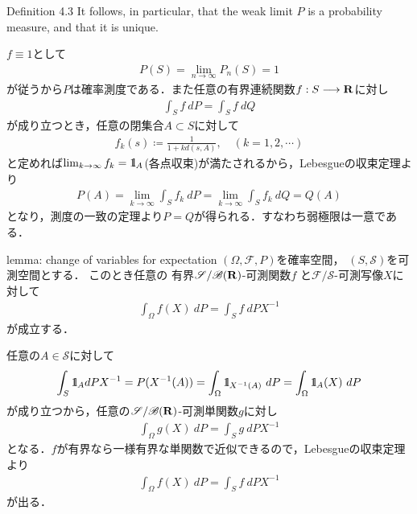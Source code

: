 	\begin{itembox}[l]{Definition 4.3}
		It follows, in particular, that the weak limit $P$ is a probability measure, 
		and that it is unique.
	\end{itembox}
	
	\begin{prf}
		$f \equiv 1$として
		\begin{align}
			P(S) = \lim_{n \to \infty} P_n(S) = 1
		\end{align}
		が従うから$P$は確率測度である．また任意の有界連続関数$f:S \longrightarrow \mathbf{R}$に対し
		\begin{align}
			\int_S f\ dP = \int_S f\ dQ
		\end{align}
		が成り立つとき，任意の閉集合$A \subset S$に対して
		\begin{align}
			f_k(s) \coloneqq \frac{1}{1 + k d(s,A)},
			\quad (k=1,2,\cdots)
		\end{align}
		と定めれば$\lim_{k \to \infty} f_k = \mbox{1}\hspace{-0.25em}\mbox{l}_A$(各点収束)が満たされるから，Lebesgueの収束定理より
		\begin{align}
			P(A) = \lim_{k \to \infty} \int_S f_k\ dP
			= \lim_{k \to \infty} \int_S f_k\ dQ
			= Q(A)
		\end{align}
		となり，測度の一致の定理より$P = Q$が得られる．すなわち弱極限は一意である．
		\QED
	\end{prf}
	
	\begin{itembox}[l]{lemma: change of variables for expectation}
		$(\Omega,\mathscr{F},P)$を確率空間，
		$(S,\mathscr{S})$を可測空間とする．
		このとき任意の
		有界$\mathscr{S}/\mathscr{B}(\mathbf{R})$-可測関数$f$
		と$\mathscr{F}/\mathscr{S}$-可測写像$X$に対して
		\begin{align}
			\int_\Omega f(X)\ dP = \int_S f\ dPX^{-1}
		\end{align}
		が成立する．
	\end{itembox}
	
	\begin{prf}
		任意の$A \in \mathscr{S}$に対して
		\begin{align}
			\int_S \mbox{1}\hspace{-0.25em}\mbox{l}_A dPX^{-1}
			= P(X^{-1}(A))
			= \int_\Omega \mbox{1}\hspace{-0.25em}\mbox{l}_{X^{-1}(A)}\ dP
			= \int_\Omega \mbox{1}\hspace{-0.25em}\mbox{l}_{A}(X)\ dP
		\end{align}
		が成り立つから，任意の$\mathscr{S}/\mathscr{B}(\mathbf{R})$-可測単関数$g$に対し
		\begin{align}
			\int_\Omega g(X)\ dP = \int_S g\ dPX^{-1}
		\end{align}
		となる．$f$が有界なら一様有界な単関数で近似できるので，Lebesgueの収束定理より
		\begin{align}
			\int_\Omega f(X)\ dP = \int_S f\ dPX^{-1}
		\end{align}
		が出る．
		\QED
	\end{prf}
	
